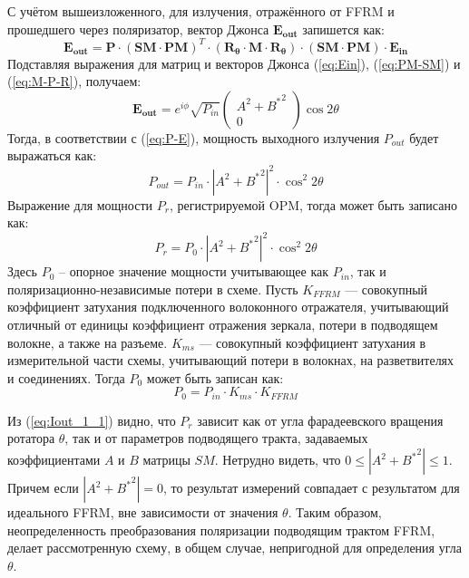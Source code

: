 \documentclass{article}
\begin{document}
С учётом вышеизложенного, для излучения, отражённого от FFRM и прошедшего через поляризатор, вектор Джонса $\bm{E_{out}}$ запишется как:
\begin{equation}
    \label{eq:E_out}
    \bm{E_{out}} = \bm{P} \cdot (\bm{SM}\cdot \bm{PM})^T\cdot (\bm{R_\theta} \cdot \bm{M} \cdot \bm{R_\theta})\cdot (\bm{SM}\cdot \bm{PM})\cdot \bm{E_{in}}
\end{equation}	
Подставляя выражения для матриц и векторов Джонса (\ref{eq:Ein}), (\ref{eq:PM-SM}) и (\ref{eq:M-P-R}), получаем:
\begin{equation}
	\bm{E_{out}} =  e^{i\phi} \sqrt{P_{in}} \begin{pmatrix} A^2 + {B^*}^2 \\ 0 \end{pmatrix}\cos 2 \theta
\end{equation}
Тогда, в соответствии с (\ref{eq:P-E}), мощность выходного излучения $P_{out}$ будет выражаться как:
\begin{equation}
	P_{out} = P_{in} \cdot \left| A^2 + {B^*}^2 \right|^2 \cdot \cos^2 2 \theta
\end{equation}
Выражение для мощности $P_r$, регистрируемой OPM, тогда может быть записано как:
\begin{equation}
	\label{eq:Iout_1_1}
	P_{r} = P_0 \cdot \left| A^2 + {B^*}^2 \right|^2 \cdot \cos^2 2 \theta
\end{equation}
Здесь $P_0$ – опорное значение мощности учитывающее как $P_{in}$, так и поляризационно-независимые потери в схеме.
Пусть $K_{FFRM}$ — совокупный коэффициент затухания подключенного волоконного отражателя, учитывающий отличный от единицы коэффициент отражения зеркала, потери в подводящем волокне, а также на разъеме.
$K_{ms}$ — совокупный коэффициент затухания в измерительной части схемы, учитывающий потери в волокнах, на разветвителях и соединениях.
Тогда $P_0$ может быть записан как:
\begin{equation}
	\label{eq:P_0}
	P_0 = P_{in}\cdot K_{ms}\cdot K_{FFRM}
\end{equation}

Из (\ref{eq:Iout_1_1}) видно, что $P_{r}$ зависит как от угла фарадеевского вращения ротатора $\theta$, так и от параметров подводящего тракта, задаваемых коэффициентами $A$ и $B$ матрицы $SM$.
Нетрудно видеть, что  $0\le\left| A^2 + {B^*}^2 \right|\le1$.
Причем если $\left| A^2 + {B^*}^2 \right|=0$, то результат измерений совпадает с результатом для идеального FFRM, вне зависимости от значения  $\theta$.
Таким образом, неопределенность преобразования поляризации подводящим трактом FFRM, делает рассмотренную схему, в общем случае, непригодной для определения угла $\theta$.
\end{document}
